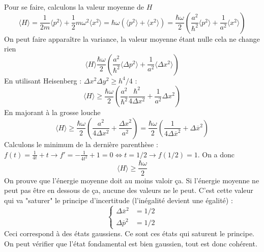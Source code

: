 		Pour se faire, calculons la valeur moyenne de $H$
		\begin{equation}
		\langle H\rangle = \frac{1}{2m}\langle p^2\rangle + \frac{1}{2}m\omega^2\langle x^2\rangle = 
		\hbar\omega\left(\langle p^2\rangle+\langle x^2\rangle\right) = \frac{\hbar\omega}{2}\left(\frac{a^2}{
		\hbar^2}\langle p^2\rangle+\frac{1}{a^2}\langle x^2\rangle\right)
		\end{equation}
		On peut faire apparaître la variance, la valeur moyenne étant nulle cela ne change rien
		\begin{equation}
		\langle H\rangle \dfrac{\hbar\omega}{2}\left(\frac{a^2}{\hbar^2}\langle\Delta p^2\rangle +\frac{1}
		{a^2}\langle\Delta 		x^2\rangle\right)
		\end{equation}
		En utilisant Heisenberg : $\Delta x^2\Delta y^2 \geq h^4/4$ :
		\begin{equation}
		\langle H\rangle \geq \dfrac{\hbar\omega}{2}\left(\dfrac{a^2}{\hbar^2}\dfrac{\hbar^2}{4\Delta x^2}
		+\frac{1}{a^2}\Delta x^2\right)
		\end{equation}
		En majorant à la grosse louche
		\begin{equation}
		\langle H\rangle \geq \dfrac{\hbar\omega}{2}\left(\frac{a^2}{4\Delta x^2}+\frac{\Delta x^2}{a^2}\right) 
		= \frac{\hbar\omega}{2}\left(\frac{1}{4\Delta \overline{x}^2}+\Delta \overline{x}^2\right)
		\end{equation}
		Calculons le minimum de la dernière parenthèse : $f(t) = \frac{1}{4t}+t \rightarrow f' = -\frac{1}{4t^2}
		+1 =0\Leftrightarrow t = 1/2 \rightarrow f(1/2)=1$. On a donc
		\begin{equation}
		\langle H\rangle \geq\dfrac{\hbar\omega}{2}
		\end{equation}		
		On prouve que l'énergie moyenne doit au moins valoir ça. Si l'énergie moyenne ne peut pas 
		être en dessous de ça, aucune des valeurs ne le peut. C'est cette valeur qui va "saturer" le 
		principe d'incertitude (l’inégalité devient une égalité) :
		\begin{equation}
		\left\{\begin{array}{ll}
		\Delta \overline{x}^2 &= 1/2\\
		\Delta \overline{p}^2 &= 1/2		
		\end{array}\right.
		\end{equation}
		Ceci correspond à des états gaussiens. Ce sont ces états qui saturent le principe. On peut vérifier
		que l'état fondamental est bien gaussien, tout est donc cohérent.
	

